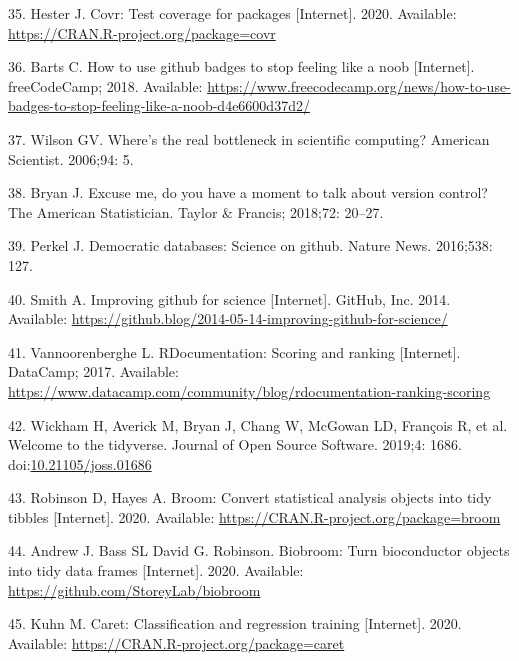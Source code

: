 \documentclass[10pt,letterpaper]{article}
\begin{document}
\leavevmode\hypertarget{ref-covr}{}%
35. Hester J. Covr: Test coverage for packages {[}Internet{]}. 2020.
Available: \url{https://CRAN.R-project.org/package=covr}

\leavevmode\hypertarget{ref-barts2018}{}%
36. Barts C. How to use github badges to stop feeling like a noob
{[}Internet{]}. freeCodeCamp; 2018. Available:
\url{https://www.freecodecamp.org/news/how-to-use-badges-to-stop-feeling-like-a-noob-d4e6600d37d2/}

\leavevmode\hypertarget{ref-wilson2006}{}%
37. Wilson GV. Where's the real bottleneck in scientific computing?
American Scientist. 2006;94: 5.

\leavevmode\hypertarget{ref-bryan2018}{}%
38. Bryan J. Excuse me, do you have a moment to talk about version
control? The American Statistician. Taylor \& Francis; 2018;72: 20--27.

\leavevmode\hypertarget{ref-perkel2016}{}%
39. Perkel J. Democratic databases: Science on github. Nature News.
2016;538: 127.

\leavevmode\hypertarget{ref-smith2014}{}%
40. Smith A. Improving github for science {[}Internet{]}. GitHub, Inc.
2014. Available:
\url{https://github.blog/2014-05-14-improving-github-for-science/}

\leavevmode\hypertarget{ref-vannoorenberghe2017}{}%
41. Vannoorenberghe L. RDocumentation: Scoring and ranking
{[}Internet{]}. DataCamp; 2017. Available:
\url{https://www.datacamp.com/community/blog/rdocumentation-ranking-scoring}

\leavevmode\hypertarget{ref-tidyverse}{}%
42. Wickham H, Averick M, Bryan J, Chang W, McGowan LD, François R, et
al. Welcome to the tidyverse. Journal of Open Source Software. 2019;4:
1686.
doi:\href{https://doi.org/10.21105/joss.01686}{10.21105/joss.01686}

\leavevmode\hypertarget{ref-broom}{}%
43. Robinson D, Hayes A. Broom: Convert statistical analysis objects
into tidy tibbles {[}Internet{]}. 2020. Available:
\url{https://CRAN.R-project.org/package=broom}

\leavevmode\hypertarget{ref-biobroom}{}%
44. Andrew J. Bass SL David G. Robinson. Biobroom: Turn bioconductor
objects into tidy data frames {[}Internet{]}. 2020. Available:
\url{https://github.com/StoreyLab/biobroom}

\leavevmode\hypertarget{ref-caret}{}%
45. Kuhn M. Caret: Classification and regression training
{[}Internet{]}. 2020. Available:
\url{https://CRAN.R-project.org/package=caret}
\end{document}
